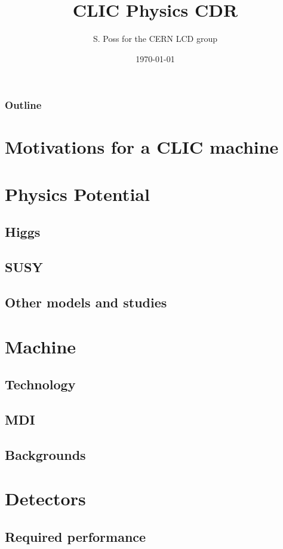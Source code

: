 \documentclass{beamer}
\author{S. Poss for the CERN LCD group}
\institute[CERN]{CERN}
\title[]{CLIC Physics CDR}
\date{\today}
\begin{document}
\begin{frame}
	\titlepage
\end{frame}

\begin{frame}
\frametitle{Outline}
\tableofcontents
\end{frame}

\section{Motivations for a CLIC machine}%

\section{Physics Potential}
\subsection{Higgs}%
\subsection{SUSY}%
\subsection{Other models and studies}%

\section{Machine}
\subsection{Technology}%
\subsection{MDI}%
\subsection{Backgrounds}%

\section{Detectors}
\subsection{Required performance}%
\end{document}
